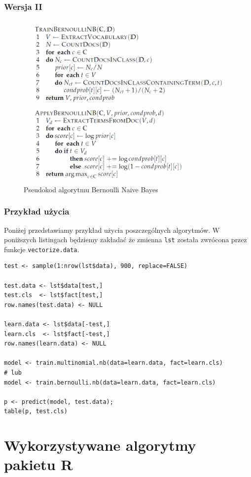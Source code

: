 \documentclass[a4paper,12pt]{article}
\begin{document}
		\subsubsection{Wersja II}
		\begin{figure}[!h]
			\centering
			\includegraphics[scale=0.45]{./img/bnbalg}
			\caption{Pseudokod algorytmu Bernoulli Naive Bayes}
		\end{figure}		

		\subsubsection{Przykład użycia}
		Poniżej przedstawiamy przykład użycia poszczególnych algorytmów.
		W poniższych listingach będziemy zakładać że zmienna \texttt{lst}
		została zwrócona przez funkcje \texttt{vectorize.data}.
		\begin{verbatim}
test <- sample(1:nrow(lst$data), 900, replace=FALSE)

test.data <- lst$data[test,]
test.cls  <- lst$fact[test,]
row.names(test.data) <- NULL

learn.data <- lst$data[-test,]
learn.cls  <- lst$fact[-test,]
row.names(learn.data) <- NULL

model <- train.multinomial.nb(data=learn.data, fact=learn.cls)
# lub
model <- train.bernoulli.nb(data=learn.data, fact=learn.cls)

p <- predict(model, test.data);
table(p, test.cls)
		\end{verbatim}
		
		\clearpage
	
\section{Wykorzystywane algorytmy pakietu R}
\end{document}
